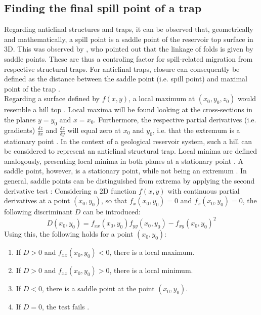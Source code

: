 			\subsection{Finding the final spill point of a trap} %
			Regarding anticlinal structures and traps, it can be observed that, geometrically and mathematically, a spill point is a saddle point of the reservoir top surface in 3D. This was observed by \citet{collignon2015fold_linkage}, who pointed out that the linkage of folds is given by saddle points. These are thus a controling factor for spill-related migration from respective structural traps. For anticlinal traps, closure can consequently be defined as the distance between the saddle point (i.e. spill point) and maximal point of the trap \citep{collignon2015fold_linkage}.\\
			Regarding a surface defined by $f(x,y)$, a local maximum at $(x_0,y_0,z_0)$ would resemble a hill top \citep{guichard2013calculus}. Local maxima will be found looking at the cross-sections in the planes $y = y_0$ and $x = x_0$. Furthermore, the respective partial derivatives (i.e. gradients) $\frac{\delta z}{\delta x}$ and $\frac{\delta z}{\delta y}$ will equal zero at $x_0$ and $y_0$, i.e. that the extremum is a stationary point \citep{guichard2013calculus, weisstein2017saddlepoint}. In the context of a geological reservoir system, such a hill can be considered to represent an anticlinal structural trap. Local minima are defined analogously, presenting local minima in both planes at a stationary point \citep{guichard2013calculus}. A saddle point, however, is a stationary point, while not being an extremum \citep{weisstein2017saddlepoint}. In general, saddle points can be distinguished from extrema by applying the second derivative test \citep{guichard2013calculus, weisstein2017saddlepoint}: Considering a 2D function $f(x,y)$ with continuous partial derivatives at a  point $(x_0,y_0)$, so that $f_x(x_0,y_0) = 0$ and $f_x(x_0,y_0) = 0$, the following discriminant $D$ can be introduced:
			\begin{equation}\label{eq:discriminant_D}
			D(x_0,y_0) = f_{xx}(x_0,y_0)f_{yy}(x_0,y_0) - f_{xy}(x_0,y_0)^2
			\end{equation}
			Using this, the following holds for a point $(x_0,y_0)$:
			\begin{enumerate}
				\item If $D > 0$ and $f_{xx}(x_0,y_0) < 0$, there is a local maximum.
				\item If $D > 0$ and $f_{xx}(x_0,y_0) > 0$, there is a local minimum.
				\item If $D < 0$, there is a saddle point at the point $(x_0,y_0)$.
				\item If $D = 0$, the test fails \citep{guichard2013calculus}.
			\end{enumerate}
